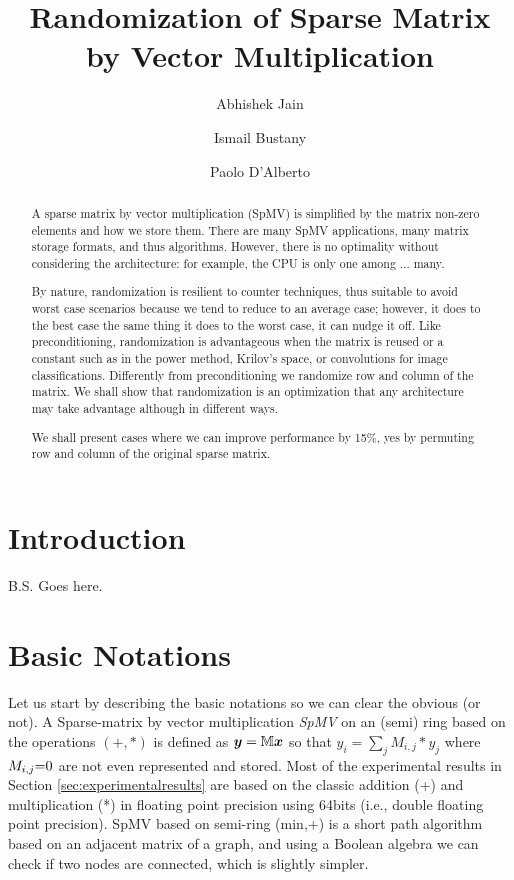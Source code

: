 \documentclass[manuscript,screen]{acmart}
\begin{document}
\title{Randomization of Sparse Matrix by Vector Multiplication }

\author{Abhishek Jain}
\author{Ismail Bustany}
\author{Paolo D'Alberto}


\renewcommand{\shortauthors}{Jain et al.}

\begin{abstract}
A sparse matrix by vector multiplication (SpMV) is simplified by the
matrix non-zero elements and how we store them. There are many SpMV
applications, many matrix storage formats, and thus
algorithms. However, there is no optimality without considering the
architecture: for example, the CPU is only one among ... many.

By nature, randomization is resilient to counter techniques, thus
suitable to avoid worst case scenarios because we tend to reduce to an
average case; however, it does to the best case the same thing it does
to the worst case, it can nudge it off. Like preconditioning,
randomization is advantageous when the matrix is reused or a constant
such as in the power method, Krilov's space, or convolutions for image
classifications. Differently from preconditioning we randomize row and
column of the matrix. We shall show that randomization is an
optimization that any architecture may take advantage although in
different ways.

We shall present cases where we can improve performance by 15\%, yes
by permuting row and column of the original sparse matrix.

\end{abstract}

\maketitle

\section{Introduction} B.S. Goes here.
\label{sec:introduction}



\section{Basic Notations}
\label{sec:notations}
Let us start by describing the basic notations so we can clear the
obvious (or not).  A Sparse-matrix by vector multiplication {\em SpMV}
on an (semi) ring based on the operations $(+,*)$ is defined as
${\boldsymbol y} = \mathbb{M} {\boldsymbol x}$ so that $y_i = \sum_j M_{i,j}*y_j$ where $M_{i,j}
{=} 0$ are not even represented and stored. Most of the experimental
results in Section \ref{sec:experimentalresults} are based on the
classic addition (+) and multiplication (*) in floating point
precision using 64bits (i.e., double floating point precision).  SpMV
based on semi-ring (min,+) is a short path algorithm based on an
adjacent matrix of a graph, and using a Boolean algebra we can check
if two nodes are connected, which is slightly simpler.
\end{document}
